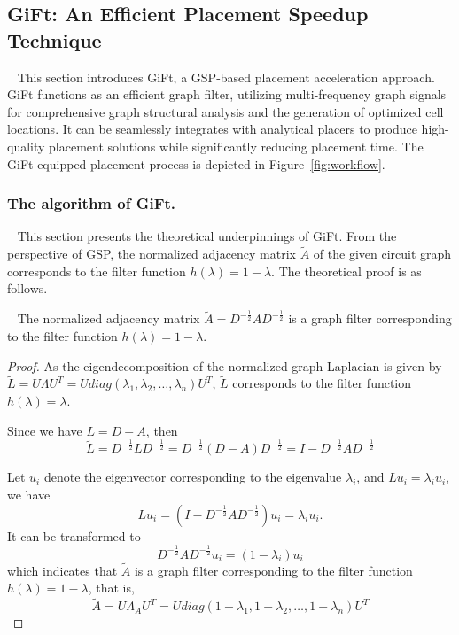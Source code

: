\subsection{GiFt: An Efficient Placement Speedup Technique}~\label{sec:method2}
This section introduces GiFt, a GSP-based placement acceleration approach. GiFt functions as an efficient graph filter, utilizing multi-frequency graph signals for comprehensive graph structural analysis and the generation of optimized cell locations. It can be seamlessly integrates with analytical placers to produce high-quality placement solutions while significantly reducing placement time. The GiFt-equipped placement process is depicted in Figure~\ref{fig:workflow}.

\subsubsection{The algorithm of GiFt.}~\label{sec:gift}
This section presents the theoretical underpinnings of GiFt.
From the perspective of GSP, the normalized adjacency matrix $\tilde{A}$ of the given circuit graph corresponds to the filter function $h(\lambda)=1-\lambda$. The theoretical proof is as follows.
\begin{theorem}~\label{proof:adj_filter}
The normalized adjacency matrix $\tilde{A}=D^{-\frac{1}{2}}AD^{-\frac{1}{2}}$ is a graph filter corresponding to the filter function $h(\lambda)=1-\lambda$.
\end{theorem}
 
\begin{proof}
As the eigendecomposition of the normalized graph Laplacian is given by $\tilde{L}=U\Lambda U^T=Udiag(\lambda_1,\lambda_2, \ldots, \lambda_n)U^T$, $\tilde{L}$ corresponds to the filter function $h(\lambda)=\lambda$.

Since we have $L=D-A$, then
\begin{equation}\label{eq:eq1}
\tilde{L}=D^{-\frac{1}{2}}LD^{-\frac{1}{2}}=D^{-\frac{1}{2}}(D-A)D^{-\frac{1}{2}}=I-D^{-\frac{1}{2}}AD^{-\frac{1}{2}}
\end{equation}

Let $u_i$ denote the eigenvector corresponding to the eigenvalue $\lambda_i$, and $Lu_i=\lambda_i u_i$, we have
\begin{equation}\label{eq:eq3}
Lu_i=(I-D^{-\frac{1}{2}}AD^{-\frac{1}{2}})u_i=\lambda_i u_i.
\end{equation}
It can be transformed to 
\begin{equation}\label{eq:eq4}
D^{-\frac{1}{2}}AD^{-\frac{1}{2}}u_i=(1-\lambda_i)u_i
\end{equation}
which indicates that $\tilde{A}$ is a graph filter corresponding to the filter function $h(\lambda)=1-\lambda$, that is, 
\begin{equation}\label{eq:eq4}
\tilde{A}=U\Lambda_A U^T=Udiag(1-\lambda_1,1-\lambda_2, \ldots, 1-\lambda_n)U^T
\end{equation}
\end{proof}

